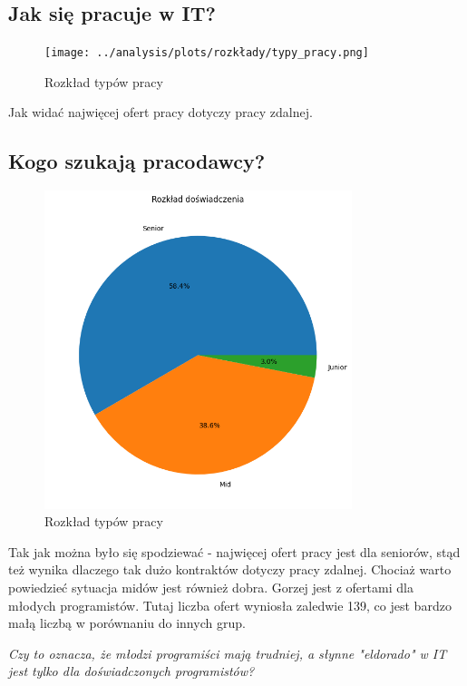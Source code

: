 \documentclass{article}
\begin{document}
\subsection{Jak się pracuje w IT?}

\begin{figure}[H]
    \centering
    \texttt{[image: ../analysis/plots/rozkłady/typy\_pracy.png]}
    \caption{Rozkład typów pracy}
\end{figure}

\quad Jak widać najwięcej ofert pracy dotyczy pracy zdalnej.


\subsection{Kogo szukają pracodawcy?}

\begin{figure}[H]
    \centering
    \includegraphics[width=0.8\textwidth]{../analysis/plots/rozkłady/doświadczenie.png}
    \caption{Rozkład typów pracy}
\end{figure}

\quad Tak jak można było się spodziewać - najwięcej ofert pracy jest dla seniorów,
stąd też wynika dlaczego tak dużo kontraktów dotyczy pracy zdalnej. Chociaż
warto powiedzieć sytuacja midów jest również dobra. Gorzej jest z ofertami dla młodych programistów.
Tutaj liczba ofert wyniosła zaledwie 139, co jest bardzo małą liczbą w porównaniu do innych grup.

\textit{Czy to oznacza, że młodzi programiści mają trudniej, a słynne "eldorado" w IT jest tylko dla doświadczonych programistów?}
\end{document}
